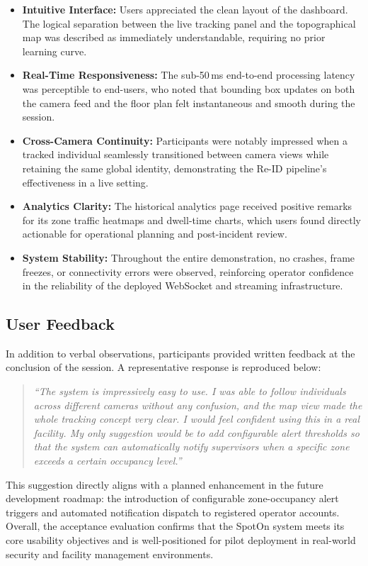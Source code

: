 \begin{itemize}
    \item \textbf{Intuitive Interface:} Users appreciated the clean layout of the dashboard. The logical separation between the live tracking panel and the topographical map was described as immediately understandable, requiring no prior learning curve.
    \item \textbf{Real-Time Responsiveness:} The sub-50\,ms end-to-end processing latency was perceptible to end-users, who noted that bounding box updates on both the camera feed and the floor plan felt instantaneous and smooth during the session.
    \item \textbf{Cross-Camera Continuity:} Participants were notably impressed when a tracked individual seamlessly transitioned between camera views while retaining the same global identity, demonstrating the Re-ID pipeline's effectiveness in a live setting.
    \item \textbf{Analytics Clarity:} The historical analytics page received positive remarks for its zone traffic heatmaps and dwell-time charts, which users found directly actionable for operational planning and post-incident review.
    \item \textbf{System Stability:} Throughout the entire demonstration, no crashes, frame freezes, or connectivity errors were observed, reinforcing operator confidence in the reliability of the deployed WebSocket and streaming infrastructure.
\end{itemize}

\subsection{User Feedback}
In addition to verbal observations, participants provided written feedback at the conclusion of the session. A representative response is reproduced below:

\begin{quote}
\textit{``The system is impressively easy to use. I was able to follow individuals across different cameras without any confusion, and the map view made the whole tracking concept very clear. I would feel confident using this in a real facility. My only suggestion would be to add configurable alert thresholds so that the system can automatically notify supervisors when a specific zone exceeds a certain occupancy level.''}
\end{quote}

This suggestion directly aligns with a planned enhancement in the future development roadmap: the introduction of configurable zone-occupancy alert triggers and automated notification dispatch to registered operator accounts. Overall, the acceptance evaluation confirms that the SpotOn system meets its core usability objectives and is well-positioned for pilot deployment in real-world security and facility management environments.